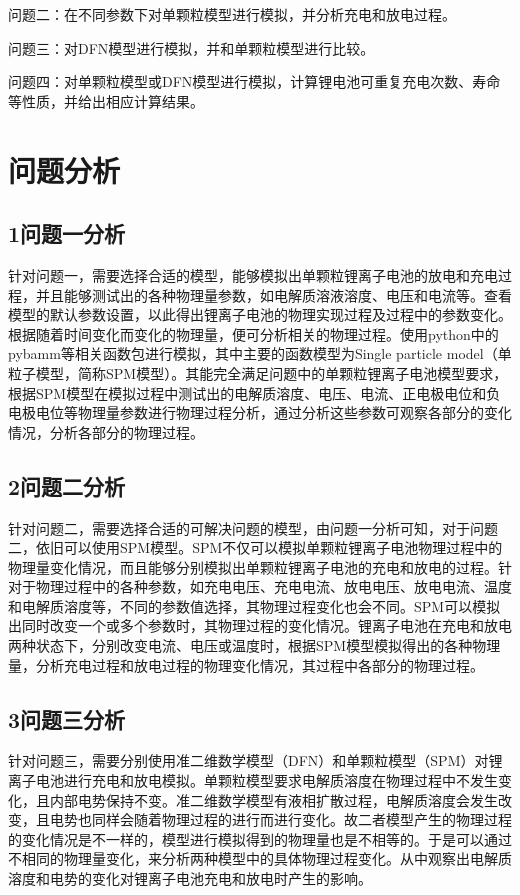 \documentclass[12pt]{ctexart}%
\begin{document}
问题二：在不同参数下对单颗粒模型进行模拟，并分析充电和放电过程。

问题三：对DFN模型进行模拟，并和单颗粒模型进行比较。

问题四：对单颗粒模型或DFN模型进行模拟，计算锂电池可重复充电次数、寿命等性质，并给出相应计算结果。
\section{问题分析}

\subsection{1问题一分析}
针对问题一，需要选择合适的模型，能够模拟出单颗粒锂离子电池的放电和充电过程，并且能够测试出的各种物理量参数，如电解质溶液溶度、电压和电流等。查看模型的默认参数设置，以此得出锂离子电池的物理实现过程及过程中的参数变化。根据随着时间变化而变化的物理量，便可分析相关的物理过程。使用python中的pybamm等相关函数包进行模拟，其中主要的函数模型为Single particle model（单粒子模型，简称SPM模型）。其能完全满足问题中的单颗粒锂离子电池模型要求，根据SPM模型在模拟过程中测试出的电解质溶度、电压、电流、正电极电位和负电极电位等物理量参数进行物理过程分析，通过分析这些参数可观察各部分的变化情况，分析各部分的物理过程。

\subsection{2问题二分析}
针对问题二，需要选择合适的可解决问题的模型，由问题一分析可知，对于问题二，依旧可以使用SPM模型。SPM不仅可以模拟单颗粒锂离子电池物理过程中的物理量变化情况，而且能够分别模拟出单颗粒锂离子电池的充电和放电的过程。针对于物理过程中的各种参数，如充电电压、充电电流、放电电压、放电电流、温度和电解质溶度等，不同的参数值选择，其物理过程变化也会不同。SPM可以模拟出同时改变一个或多个参数时，其物理过程的变化情况。锂离子电池在充电和放电两种状态下，分别改变电流、电压或温度时，根据SPM模型模拟得出的各种物理量，分析充电过程和放电过程的物理变化情况，其过程中各部分的物理过程。

\subsection{3问题三分析}
针对问题三，需要分别使用准二维数学模型（DFN）和单颗粒模型（SPM）对锂离子电池进行充电和放电模拟。单颗粒模型要求电解质溶度在物理过程中不发生变化，且内部电势保持不变。准二维数学模型有液相扩散过程，电解质溶度会发生改变，且电势也同样会随着物理过程的进行而进行变化。故二者模型产生的物理过程的变化情况是不一样的，模型进行模拟得到的物理量也是不相等的。于是可以通过不相同的物理量变化，来分析两种模型中的具体物理过程变化。从中观察出电解质溶度和电势的变化对锂离子电池充电和放电时产生的影响。
\end{document}
